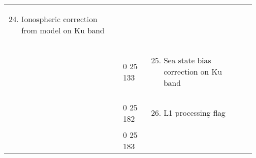 \begin{longtable}[]{@{}llll@{}}
\begin{minipage}[t]{0.22\columnwidth}
\begin{enumerate}
\setcounter{enumi}{23}
\item
  Ionospheric correction from model on Ku band
\end{enumerate}\strut
\end{minipage} & \begin{minipage}[t]{0.22\columnwidth}\raggedright
\strut
\end{minipage}\tabularnewline
\begin{minipage}[t]{0.22\columnwidth}\raggedright
\strut
\end{minipage} & \begin{minipage}[t]{0.22\columnwidth}\raggedright
0 25 133\strut
\end{minipage} & \begin{minipage}[t]{0.22\columnwidth}\raggedright
\begin{enumerate}
\setcounter{enumi}{24}
\item
  Sea state bias correction on Ku band
\end{enumerate}\strut
\end{minipage} & \begin{minipage}[t]{0.22\columnwidth}\raggedright
\strut
\end{minipage}\tabularnewline
\begin{minipage}[t]{0.22\columnwidth}\raggedright
\strut
\end{minipage} & \begin{minipage}[t]{0.22\columnwidth}\raggedright
0 25 182\strut
\end{minipage} & \begin{minipage}[t]{0.22\columnwidth}\raggedright
\begin{enumerate}
\setcounter{enumi}{25}
\item
  L1 processing flag
\end{enumerate}\strut
\end{minipage} & \begin{minipage}[t]{0.22\columnwidth}\raggedright
\strut
\end{minipage}\tabularnewline
\begin{minipage}[t]{0.22\columnwidth}\raggedright
\strut
\end{minipage} & \begin{minipage}[t]{0.22\columnwidth}\raggedright
0 25 183\strut
\end{minipage} & \begin{minipage}[t]{0.22\columnwidth}\raggedright
\begin{enumerate}

\end{enumerate}
\end{minipage}
\end{longtable}
